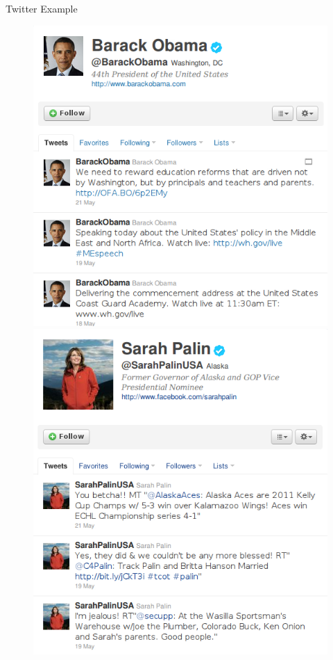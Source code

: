 \documentclass{beamer}
\begin{document}
\begin{frame}{Twitter Example}
  \begin{figure}[!ht]
   \centering
   \includegraphics[scale=.3]{pres3.png}
   \includegraphics[scale=.3]{pres4.png}  
 \end{figure}
\end{frame}
\end{document}
